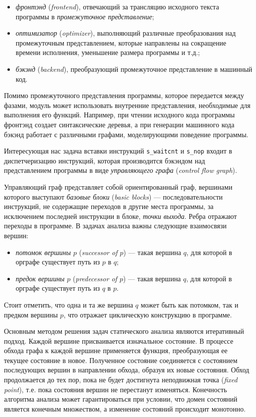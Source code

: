 \documentclass[a4paper,14pt]{extarticle}
\newenvironment{ul}{\begin{itemize}[noitemsep,topsep=0em]}{\end{itemize}\vspace{4mm}}
\newenvironment{inlineul}{\begin{itemize}[noitemsep,topsep=0em]}{\end{itemize}}
\begin{document}
\begin{ul}
\item \textit{фронтэнд} (\textit{frontend}), отвечающий за трансляцию исходного текста программы в
  \textit{промежуточное представление};
\item \textit{оптимизатор} (\textit{optimizer}), выполняющий различные преобразования над промежуточным
  представлением, которые направлены на сокращение времени исполнения,
  уменьшение размера программы и т.д.;
\item \textit{бэкэнд} (\textit{backend}), преобразующий промежуточное представление в машинный код.
\end{ul}

Помимо промежуточного представления программы, которое передается между фазами,
модуль может использовать внутренние представления, необходимые для выполнения его функций.
Например, при чтении исходного кода программы фронтэнд создает синтаксические деревья,
а при генерации машинного кода бэкэнд работает с различными графами, моделирующими поведение
программы.

Интересующая нас задача вставки инструкций \texttt{s\_waitcnt} и \texttt{s\_nop} входит
в диспетчеризацию инструкций, которая производится бэкэндом над представлением программы
в виде \textit{управляющего графа} (\textit{control flow graph}).

Управляющий граф\cite{cfg-allen}\cite{cfg-ru} представляет собой ориентированный граф, вершинами которого
выступают \textit{базовые блоки} (\textit{basic blocks}) — последовательности инструкций,
не содержащие переходов в другие места программы, за исключением последней
инструкции в блоке, \textit{точки выхода}. Ребра отражают переходы в программе.
В задачах анализа важны следующие взаимосвязи вершин:
\begin{inlineul}
\item \textit{потомок вершины $p$} (\textit{successor of $p$}) — такая вершина $q$,
  для которой в орграфе существует путь из $p$ в $q$;
\item \textit{предок вершины $p$} (\textit{predecessor of $p$}) — такая вершина $q$,
  для которой в орграфе существует путь из $q$ в $p$.
\end{inlineul}
Стоит отметить, что одна и та же вершина $q$ может быть как потомком, так и предком вершины $p$,
что отражает циклическую конструкцию в программе.

Основным методом решения задач статического анализа являются итеративный подход\cite[Глава~8]{compilers}.
Каждой вершине присваивается изначальное состояние. В процессе обхода графа к каждой вершине
применяется функция, преобразующая ее текущее состояние в новое. Полученное состояние
соединяется с состоянием последующих вершин в направлении обхода, образуя их новые состояния.
Обход продолжается до тех пор, пока не будет достигнута неподвижная точка (\textit{fixed point}), т.е.
пока состояния вершин не перестанут изменяться. Конечность алгоритма анализа может гарантироваться
при условии, что домен состояний является конечным множеством, а изменение состояний происходит монотонно.
\end{document}
